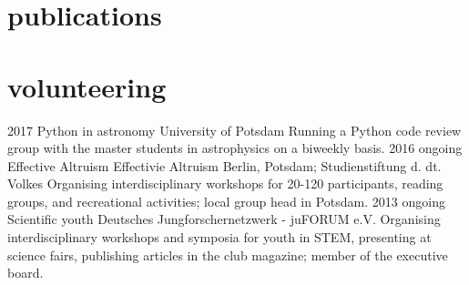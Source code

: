 \documentclass[]{k-cv} %
\begin{document}
\section{publications}

\section{volunteering}
\begin{entrylist}
\entry
{2017 }
{Python in astronomy}
{University of Potsdam}
{Running a Python code review group with the master students in astrophysics on a biweekly basis.}
\entry
{2016 \to ongoing}
{Effective Altruism}
{Effectivie Altruism Berlin, Potsdam; Studienstiftung d. dt. Volkes}
{Organising interdisciplinary workshops for 20-120 participants, reading groups, and recreational activities; local group head in Potsdam.}
\entry
{2013 \to ongoing}
{Scientific youth}
{Deutsches Jungforschernetzwerk - juFORUM e.V.}
{Organising interdisciplinary workshops and symposia for youth in STEM, presenting at science fairs, publishing articles in the club magazine; member of the executive board.}
\end{entrylist}
\end{document}
